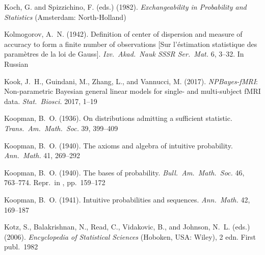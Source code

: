\documentclass[%
]{frontiersSCNS-nologo} %
\newcommand*{\langfrench}{\foreignlanguage{french}}
\newcommand*{\citebi}[2][]{\citet[#1]{#2}%
}
\newcommand*{\subtitleproc}[1]{}
\renewcommand*{\|}{\mathpunct{|}}%
\begin{document}
\begin{thebibliography}{156}
Koch, G. and Spizzichino, F. (eds.) (1982).
\newblock \emph{Exchangeability in Probability and Statistics\subtitleproc{:
  Proceedings of the International Conference on Exchangeability in Probability
  and Statistics}} (Amsterdam: North-Holland)

Kolmogorov, A.~N. (1942).
\newblock Definition of center of dispersion and measure of accuracy to form a
  finite number of observations \langfrench{[{Sur} l'{\'e}stimation statistique
  des param{\`e}tres de la loi de {Gauss}]}.
\newblock \emph{Izv.\ Akad.\ Nauk SSSR Ser.\ Mat.} 6, 3--32.
\newblock In Russian

Kook, J.~H., Guindani, M., Zhang, L., and Vannucci, M. (2017).
\newblock \emph{{NPBayes-fMRI}}: Non-parametric {Bayesian} general linear
  models for single- and multi-subject {fMRI} data.
\newblock \emph{Stat.\ Biosci.} 2017, 1--19

Koopman, B.~O. (1936).
\newblock On distributions admitting a sufficient statistic.
\newblock \emph{Trans.\ Am.\ Math.\ Soc.} 39, 399--409

Koopman, B.~O. (1940{}).
\newblock The axioms and algebra of intuitive probability.
\newblock \emph{Ann.\ Math.} 41, 269--292

Koopman, B.~O. (1940{}).
\newblock The bases of probability.
\newblock \emph{Bull.\ Am.\ Math.\ Soc.} 46, 763--774.
\newblock Repr.\ in \citebi{kyburgetal1964_r1980}, pp.~159--172

Koopman, B.~O. (1941).
\newblock Intuitive probabilities and sequences.
\newblock \emph{Ann.\ Math.} 42, 169--187

Kotz, S., Balakrishnan, N., Read, C., Vidakovic, B., and Johnson, N.~L. (eds.)
  (2006).
\newblock \emph{Encyclopedia of Statistical Sciences} (Hoboken, USA: Wiley), 2
  edn.
\newblock First publ.\ 1982


\end{thebibliography}
\end{document}
